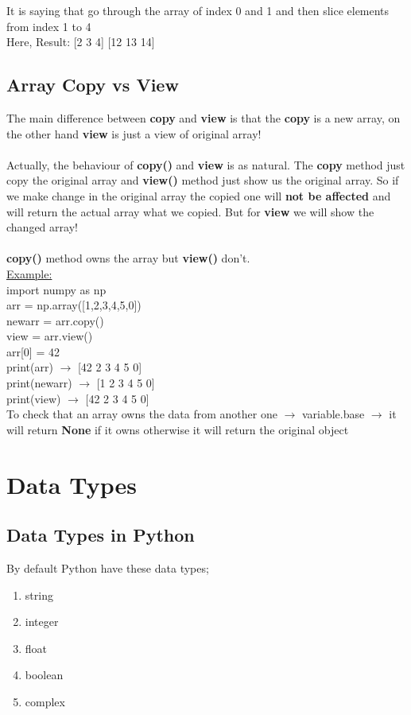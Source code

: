 \documentclass[openany]{book}
\begin{document}
It is saying that go through the array of index 0 and 1 and then slice elements from index 1 to 4 \\

Here, Result: [2 3 4] [12 13 14]
\newpage

\section{Array Copy vs View}
The main difference between \textbf{copy} and \textbf{view} is that the \textbf{copy} is a new array, on the other hand  \textbf{view} is just a view of original array! \\ \\
Actually, the behaviour of \textbf{copy()} and \textbf{view} is as natural. The \textbf{copy} method just copy the original array and \textbf{view()} method just show us the original array. So if we make change in the original array the copied one will \textbf{not be affected} and will return the actual array what we copied. But for \textbf{view} we will show the changed array!\\ \\

\textbf{copy()} method owns the array but \textbf{view()} don't.
\\ 
\underline{Example:} \\
import numpy as np \\
arr = np.array([1,2,3,4,5,0]) \\

newarr = arr.copy() \\
view = arr.view()\\
arr[0] = 42\\


print(arr) $\rightarrow$ [42  2  3  4  5  0] \\
print(newarr) $\rightarrow$ [1 2 3 4 5 0]\\
print(view) $\rightarrow$ [42  2  3  4  5  0]\\

To check that an array owns the data from another one $\rightarrow$ variable.base $\rightarrow$ it will return \textbf{None} if it owns otherwise it will return the original object
\chapter{Data Types}

\section{Data Types in Python}
By default Python have these data types;
\begin{enumerate}
    \item string
    \item integer
    \item float
    \item boolean
    \item complex
\end{enumerate}
\end{document}

